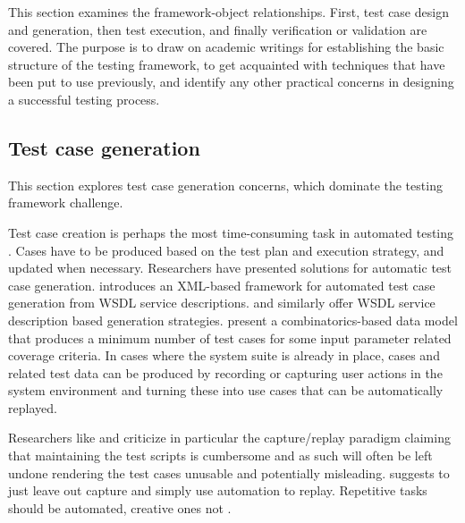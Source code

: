 \documentclass[12pt,a4paper,oneside,pdftex]{report}
\begin{document}
{This section examines the framework-object relationships. First, test case design and generation, then test execution, and finally verification or validation are covered. The purpose is to draw on academic writings for establishing the basic structure of the testing framework, to get acquainted with techniques that have been put to use previously, and identify any other practical concerns in designing a successful testing process.

\subsection{Test case generation}
This section explores test case generation concerns, which dominate the testing framework challenge.

Test case creation is perhaps the most time-consuming task in automated testing \citep{kit1999integrated}. Cases have to be produced based on the test plan and execution strategy, and updated when necessary. Researchers have presented solutions for automatic test case generation. \citet{tsai2002coyote} introduces an XML-based framework for automated test case generation from WSDL service descriptions. \citet{bai2005WSDL} and \citet{di2007web} similarly offer WSDL service description based generation strategies. \citet{dalal1999model} present a combinatorics-based data model that produces a minimum number of test cases for some input parameter related coverage criteria. In cases where the system suite is already in place, cases and related test data can be produced by recording or capturing user actions in the system environment and turning these into use cases that can be automatically replayed.

Researchers like \citet{zallar2001you} and \citet{kit1999integrated} criticize in particular the capture/replay paradigm claiming that maintaining the test scripts is cumbersome and as such will often be left undone rendering the test cases unusable and potentially misleading. \citet{kit1999integrated} suggests to just leave out capture and simply use automation to replay. Repetitive tasks should be automated, creative ones not \citep{pezze2008software}.

}
\end{document}
